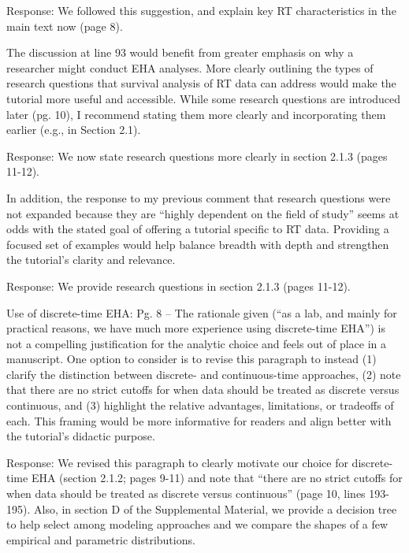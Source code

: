 \documentclass[
]{article}
\renewenvironment{quote}{\begin{leftbar}}{\end{leftbar}}
\begin{document}
Response: We followed this suggestion, and explain key RT
characteristics in the main text now (page 8).

\begin{quote}
The discussion at line 93 would benefit from greater emphasis on why a
researcher might conduct EHA analyses. More clearly outlining the types
of research questions that survival analysis of RT data can address
would make the tutorial more useful and accessible. While some research
questions are introduced later (pg. 10), I recommend stating them more
clearly and incorporating them earlier (e.g., in Section 2.1).
\end{quote}

Response: We now state research questions more clearly in section 2.1.3
(pages 11-12).

\begin{quote}
In addition, the response to my previous comment that research questions
were not expanded because they are ``highly dependent on the field of
study'' seems at odds with the stated goal of offering a tutorial
specific to RT data. Providing a focused set of examples would help
balance breadth with depth and strengthen the tutorial's clarity and
relevance.
\end{quote}

Response: We provide research questions in section 2.1.3 (pages 11-12).

\begin{quote}
Use of discrete-time EHA: Pg. 8 -- The rationale given (``as a lab, and
mainly for practical reasons, we have much more experience using
discrete-time EHA'') is not a compelling justification for the analytic
choice and feels out of place in a manuscript. One option to consider is
to revise this paragraph to instead (1) clarify the distinction between
discrete- and continuous-time approaches, (2) note that there are no
strict cutoffs for when data should be treated as discrete versus
continuous, and (3) highlight the relative advantages, limitations, or
tradeoffs of each. This framing would be more informative for readers
and align better with the tutorial's didactic purpose.
\end{quote}

Response: We revised this paragraph to clearly motivate our choice for
discrete-time EHA (section 2.1.2; pages 9-11) and note that ``there are
no strict cutoffs for when data should be treated as discrete versus
continuous'' (page 10, lines 193-195). Also, in section D of the
Supplemental Material, we provide a decision tree to help select among
modeling approaches and we compare the shapes of a few empirical and
parametric distributions.
\end{document}
